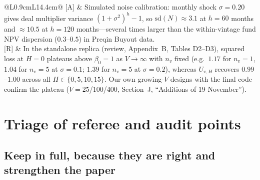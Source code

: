 \documentclass[11pt]{article}
\newcommand{\evidencetag}[1]{\textsf{\small[#1]}}
\begin{document}
{\begin{longtable}{@{}L{0.9cm}L{14.4cm}@{}}
\evidencetag{A} & Simulated noise calibration: monthly shock $\sigma=0.20$ gives deal multiplier variance $(1+\sigma^2)^h-1$, so $\mathrm{sd}(N)\approx 3.1$ at $h=60$ months and $\approx 10.5$ at $h=120$ months—several times larger than the within-vintage fund NPV dispersion ($0.3$--$0.5$) in Preqin Buyout data.\\
\evidencetag{R} & In the standalone replica (review, Appendix~B, Tables D2--D3), squared loss at $H=0$ plateaus above $\beta_0=1$ as $V\to\infty$ with $n_v$ fixed (e.g.\ $1.17$ for $n_v=1$, $1.04$ for $n_v=5$ at $\sigma=0.1$; $1.39$ for $n_v=5$ at $\sigma=0.2$), whereas $U_{v,H}$ recovers $0.99$--$1.00$ across all $H\in\{0,5,10,15\}$. Our own growing-$V$ designs with the final code confirm the plateau ($V=25$/100/400, Section~J, ``Additions of 19 November'').\\
\bottomrule
\end{longtable}
}

\section{Triage of referee and audit points}
\label{sec:triage}

\subsection{Keep in full, because they are right and strengthen the paper}
\end{document}
